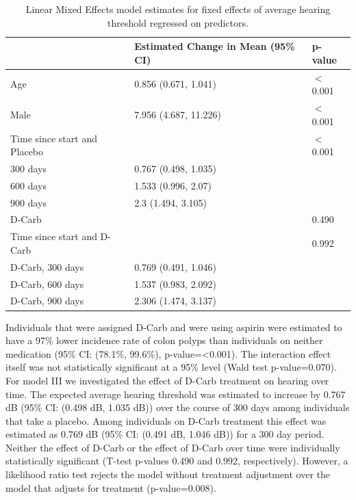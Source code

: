 \documentclass[paper=a4, fontsize=11pt]{scrartcl} %
\numberwithin{equation}{section} %
\numberwithin{figure}{section} %
\numberwithin{table}{section} %
\begin{document}
\begin{table}
\centering
\caption{Linear Mixed Effects model estimates for fixed effects of average hearing threshold regressed on predictors.}
\label{tab:model_iii_results}
\begin{tabular}{m{4cm} m{3.5cm} l}
  \hline
 & Estimated Change in Mean (95\% CI) & p-value \\ 
  \hline
  Age & 0.856 (0.671, 1.041) & $<$0.001 \\ 
  Male & 7.956 (4.687, 11.226) & $<$0.001 \\ 
  Time since start and Placebo & & $<$0.001\\
  300 days & 0.767 (0.498, 1.035) &  \\ 
  600 days & 1.533 (0.996, 2.07) & \\ 
  900 days & 2.3 (1.494, 3.105) & \\ 
  D-Carb & & 0.490\\
  Time since start and D-Carb & &0.992 \\
  D-Carb, 300 days & 0.769 (0.491, 1.046) & \\ 
  D-Carb, 600 days & 1.537 (0.983, 2.092) & \\ 
  D-Carb, 900 days & 2.306 (1.474, 3.137) & \\ 
   \hline
\end{tabular}
\end{table}


Individuals that were assigned D-Carb and were using aspirin were estimated to have a 97\% lower incidence rate of colon polyps than individuals on neither medication (95\% CI: (78.1\%, 99.6\%), p-value=<0.001). The interaction effect itself was not statistically significant at a 95\% level (Wald test p-value=0.070). For model III we investigated the effect of D-Carb treatment on hearing over time. The expected average hearing threshold was estimated to increase by 0.767 dB (95\% CI: (0.498 dB, 1.035 dB)) over the course of 300 days among individuals that take a placebo. Among individuals on D-Carb treatment this effect was estimated as 0.769 dB (95\% CI: (0.491 dB, 1.046 dB)) for a 300 day period. Neither the effect of D-Carb or the effect of D-Carb over time were individually statistically significant (T-test p-values 0.490 and 0.992, respectively). However, a likelihood ratio test rejects the model without treatment adjustment over the model that adjusts for treatment (p-value=0.008).
\end{document}
